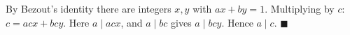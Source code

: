By Bezout's identity there are integers $x,y$ with $ax+by=1$. Multiplying by $c$: $c=acx+bcy$. Here $a\mid acx$, and $a\mid bc$ gives $a\mid bcy$. Hence $a\mid c$. $\blacksquare$
